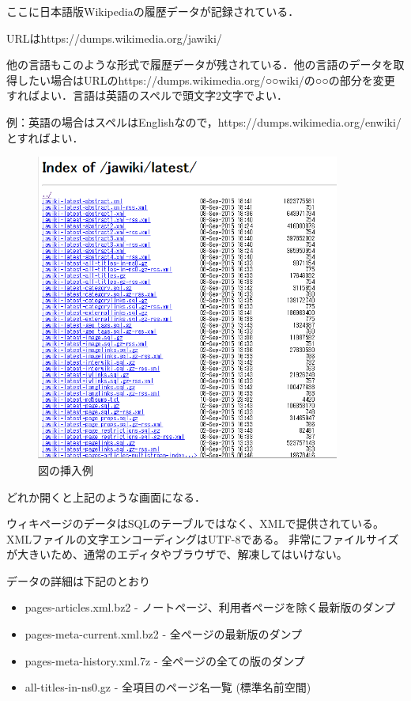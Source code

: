 ここに日本語版Wikipediaの履歴データが記録されている．

URLはhttps://dumps.wikimedia.org/jawiki/

他の言語もこのような形式で履歴データが残されている．他の言語のデータを取得したい場合はURLのhttps://dumps.wikimedia.org/○○wiki/の○○の部分を変更すればよい．言語は英語のスペルで頭文字2文字でよい．

例：英語の場合はスペルはEnglishなので，https://dumps.wikimedia.org/enwiki/とすればよい．



\begin{figure}[htb]
\centering
\includegraphics[width=10cm]{sample5.png}
\caption{図の挿入例}\label{サンプル図}
\end{figure}

どれか開くと上記のような画面になる．

ウィキページのデータはSQLのテーブルではなく、XMLで提供されている。XMLファイルの文字エンコーディングはUTF-8である。 非常にファイルサイズが大きいため、通常のエディタやブラウザで、解凍してはいけない。

データの詳細は下記のとおり

\begin{itemize}
 \item pages-articles.xml.bz2 - ノートページ、利用者ページを除く最新版のダンプ
 \item pages-meta-current.xml.bz2 - 全ページの最新版のダンプ
 \item pages-meta-history.xml.7z - 全ページの全ての版のダンプ
 \item all-titles-in-ns0.gz - 全項目のページ名一覧 (標準名前空間)
\end{itemize}


